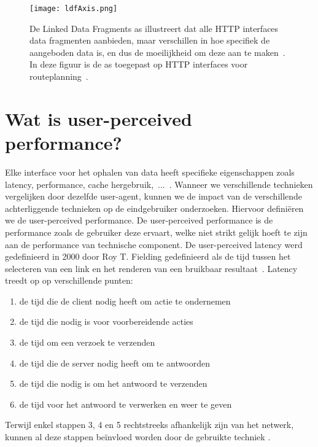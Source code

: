 \begin{figure}
	\centering
		\texttt{[image: ldfAxis.png]}
	\caption[Routeplanning HTTP interfaces op de LDF as]{De Linked Data Fragments as illustreert dat alle HTTP interfaces data fragmenten aanbieden, maar verschillen in hoe specifiek de aangeboden data is, en dus de moeilijkheid om deze aan te maken~\citep{verborgh14}. In deze figuur is de as toegepast op HTTP interfaces voor routeplanning~\citep{colpaert15}.}
	\label{fig:ldfAxis}
\end{figure}

\section{Wat is user-perceived performance?}
\label{sec:what_is_user_perceived_performance}
Elke interface voor het ophalen van data heeft specifieke eigenschappen zoals latency, performance, cache hergebruik,~...~\citep{verborgh16}. Wanneer we verschillende technieken vergelijken door dezelfde user-agent, kunnen we de impact van de verschillende achterliggende technieken op de eindgebruiker onderzoeken. Hiervoor definiëren we de user-perceived performance. De user-perceived performance is de performance zoals de gebruiker deze ervaart, welke niet strikt gelijk hoeft te zijn aan de performance van technische component. De user-perceived latency werd gedefinieerd in 2000 door Roy T. Fielding gedefinieerd als de tijd tussen het selecteren van een link en het renderen van een bruikbaar resultaat~\citep{fielding99}. Latency treedt op op verschillende punten: 
\begin{enumerate}
	\item de tijd die de client nodig heeft om actie te ondernemen 
	\item de tijd die nodig is voor voorbereidende acties
	\item de tijd om een verzoek te verzenden
	\item de tijd die de server nodig heeft om te antwoorden
	\item de tijd die nodig is om het antwoord te verzenden
	\item de tijd voor het antwoord te verwerken en weer te geven
\end{enumerate}
Terwijl enkel stappen 3, 4 en 5 rechtstreeks afhankelijk zijn van het netwerk, kunnen al deze stappen beïnvloed worden door de gebruikte techniek \citep{fielding99}.

